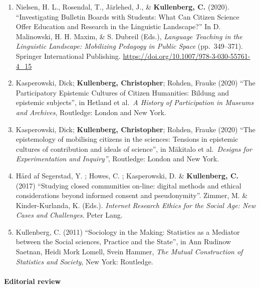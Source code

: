\documentclass[
]{article}
\providecommand{\tightlist}{%
  \setlength{\itemsep}{0pt}\setlength{\parskip}{0pt}}
\begin{document}
\begin{enumerate}
\def\labelenumi{\arabic{enumi}.}
\tightlist
\item
  Nielsen, H. L., Rosendal, T., Järlehed, J., \& \textbf{Kullenberg, C.}
  (2020). ``Investigating Bulletin Boards with Students: What Can
  Citizen Science Offer Education and Research in the Linguistic
  Landscape?'' In D. Malinowski, H. H. Maxim, \& S. Dubreil (Eds.),
  \emph{Language Teaching in the Linguistic Landscape: Mobilizing
  Pedagogy in Public Space} (pp.~349--371). Springer International
  Publishing. \url{https://doi.org/10.1007/978-3-030-55761-4_15}
\item
  Kasperowski, Dick; \textbf{Kullenberg, Christopher}; Rohden, Frauke
  (2020) ``The Participatory Epistemic Cultures of Citizen Humanities:
  Bildung and epistemic subjects'', in Hetland et al.~\emph{A History of
  Participation in Museums and Archives}, Routledge: London and New
  York.
\item
  Kasperowski, Dick; \textbf{Kullenberg, Christopher}; Rohden, Frauke
  (2020) ``The epistemology of mobilising citizens in the sciences:
  Tensions in epistemic cultures of contribution and ideals of
  science'', in Mäkitalo et al.~\emph{Designs for Experimentation and
  Inquiry''}, Routledge: London and New York.
\item
  Hård af Segerstad, Y. ; Howes, C. ; Kasperowski, D. \&
  \textbf{Kullenberg, C.} (2017) ``Studying closed communities on-line:
  digital methods and ethical considerations beyond informed consent and
  pseudonymity''. Zimmer, M. \& Kinder-Kurlanda, K. (Eds.).
  \emph{Internet Research Ethics for the Social Age: New Cases and
  Challenges}. Peter Lang.
\item
  Kullenberg, C. (2011) ``Sociology in the Making: Statistics as a
  Mediator between the Social sciences, Practice and the State'', in Ann
  Rudinow Saetnan, Heidi Mork Lomell, Svein Hammer, \emph{The Mutual
  Construction of Statistics and Society}, New York: Routledge.
\end{enumerate}

\hypertarget{editorial-review}{%
\paragraph{Editorial review}\label{editorial-review}}
\end{document}
